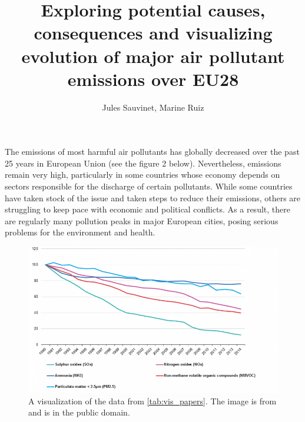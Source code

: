 \documentclass[preprint,journal]{vgtc}       %
\title{Exploring potential causes, consequences and visualizing evolution of major air pollutant emissions over EU28}
\author{Jules Sauvinet, Marine Ruiz}
\begin{document}


\maketitle

The emissions of most harmful air pollutants has globally decreased over the past 25 years in European Union (see the figure 2 below).
Nevertheless, emissions remain very high, particularly in some countries whose economy depends on sectors responsible for the discharge of certain pollutants. While some countries have taken stock of the issue and taken steps to reduce their emissions, others are struggling to keep pace with economic and political conflicts.
As a result, there are regularly many pollution peaks in major European cities, posing serious problems for the environment and health.

\begin{figure}[tb]
 \centering %
 \includegraphics[width=\columnwidth]{decreased_emissions}
 \caption{A visualization of the data from \autoref{tab:vis_papers}. The image is from \cite{Eurostats:2016:VMC} and is in the public domain.}
 \label{fig:pollution decrease}
\end{figure}
\end{document}
